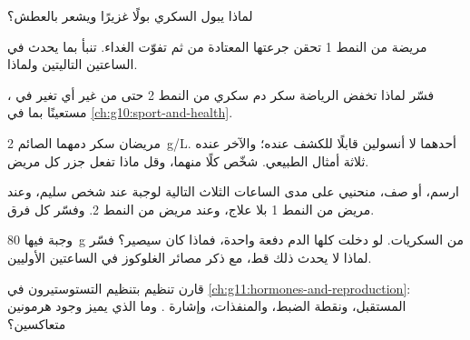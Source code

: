 \begin{exercise}[$\star\star$]\label{exo:g12:glucose-and-diabetes:9}
لماذا يبول السكري بولًا غزيرًا ويشعر بالعطش؟
\end{exercise}

\begin{exercise}[$\star\star$]\label{exo:g12:glucose-and-diabetes:10}
مريضة من النمط 1 تحقن جرعتها المعتادة من  ثم تفوّت الغداء.
تنبأ بما يحدث في الساعتين التاليتين ولماذا.
\end{exercise}

\begin{exercise}[$\star\star$]\label{exo:g12:glucose-and-diabetes:11}
فسّر لماذا تخفض الرياضة سكر دم سكري من النمط 2 حتى من غير أي تغير في
، مستعينًا بما في \cref{ch:g10:sport-and-health}.
\end{exercise}

\begin{exercise}[$\star\star\star$]\label{exo:g12:glucose-and-diabetes:12}
مريضان سكر دمهما الصائم \qty{2}{g/L}. أحدهما لا أنسولين قابلًا للكشف
عنده؛ والآخر عنده ثلاثة أمثال  الطبيعي. شخّص كلًا منهما، وقل
ماذا تفعل جزر كل مريض.
\end{exercise}

\begin{exercise}[$\star\star\star$]\label{exo:g12:glucose-and-diabetes:13}
ارسم، أو صف، منحنيي   على مدى الساعات الثلاث التالية
لوجبة عند شخص سليم، وعند مريض من النمط 1 بلا علاج، وعند مريض من النمط
2. وفسّر كل فرق.
\end{exercise}

\begin{exercise}[$\star\star\star$]\label{exo:g12:glucose-and-diabetes:14}
وجبة فيها \qty{80}{g} من السكريات. لو دخلت كلها الدم دفعة واحدة، فماذا
كان  سيصير؟ فسّر لماذا لا يحدث ذلك قط، مع ذكر مصائر الغلوكوز
في الساعتين الأوليين.
\end{exercise}

\begin{exercise}[$\star\star\star$]\label{exo:g12:glucose-and-diabetes:15}
قارن تنظيم  بتنظيم التستوستيرون في
\cref{ch:g11:hormones-and-reproduction}: المستقبل، ونقطة الضبط،
والمنفذات، وإشارة . وما الذي يميز وجود هرمونين
متعاكسين؟
\end{exercise}

